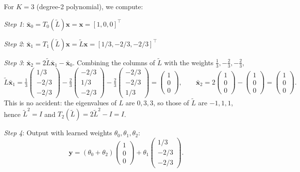 \begin{notechapter}
\begin{example}
For $K=3$ (degree-2 polynomial), we compute:

\emph{Step 1}: $\bar{\mathbf{x}}_0 = T_0(\tilde{L})\mathbf{x} = \mathbf{x} = [1, 0, 0]^\top$

\emph{Step 2}: $\bar{\mathbf{x}}_1 = T_1(\tilde{L})\mathbf{x} = \tilde{L}\mathbf{x} = [1/3, -2/3, -2/3]^\top$

\emph{Step 3}: $\bar{\mathbf{x}}_2 = 2\tilde{L}\bar{\mathbf{x}}_1 - \bar{\mathbf{x}}_0$. Combining the columns of $\tilde L$ with the weights $\frac13, -\frac23, -\frac23$,
\[
\tilde{L}\bar{\mathbf{x}}_1
= \tfrac{1}{3}\begin{pmatrix} 1/3 \\ -2/3 \\ -2/3 \end{pmatrix}
- \tfrac{2}{3}\begin{pmatrix} -2/3 \\ 1/3 \\ -2/3 \end{pmatrix}
- \tfrac{2}{3}\begin{pmatrix} -2/3 \\ -2/3 \\ 1/3 \end{pmatrix}
= \begin{pmatrix} 1 \\ 0 \\ 0 \end{pmatrix},
\qquad
\bar{\mathbf{x}}_2 = 2\begin{pmatrix} 1 \\ 0 \\ 0 \end{pmatrix} - \begin{pmatrix} 1 \\ 0 \\ 0 \end{pmatrix} = \begin{pmatrix} 1 \\ 0 \\ 0 \end{pmatrix}.
\]
This is no accident: the eigenvalues of $L$ are $0, 3, 3$, so those of $\tilde L$ are $-1, 1, 1$, hence $\tilde L^2 = I$ and $T_2(\tilde L) = 2\tilde L^2 - I = I$.

\emph{Step 4}: Output with learned weights $\theta_0, \theta_1, \theta_2$:
\[
\mathbf{y} = (\theta_0 + \theta_2) \begin{pmatrix} 1 \\ 0 \\ 0 \end{pmatrix}
+ \theta_1 \begin{pmatrix} 1/3 \\ -2/3 \\ -2/3 \end{pmatrix}.
\]


\end{example}
\end{notechapter}
